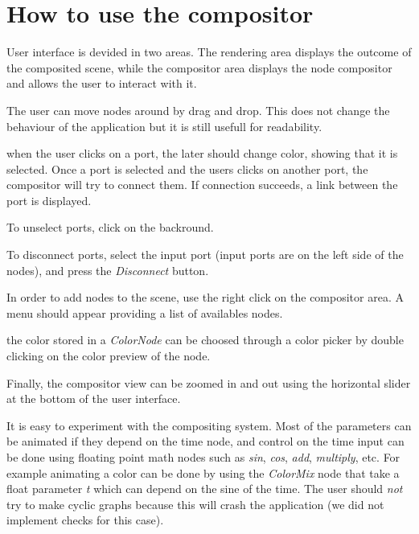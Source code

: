 

\section{ How to use the compositor }

User interface is devided in two areas. The rendering area displays the outcome of the composited scene,
while the compositor area displays the node compositor and allows the user to interact with it.

The user can move nodes around by drag and drop. This does not change the behaviour of the
application but it is still usefull for readability.

when the user clicks on a port, the later should change color, showing that it is selected.
Once a port is selected and the users clicks on another port, the compositor will
try to connect them. If connection succeeds, a link between the port is displayed.

To unselect ports, click on the backround.

To disconnect ports, select the input port (input ports are on the left side of
the nodes), and press the \textit{Disconnect} button.

In order to add nodes to the scene, use the right click on the compositor area.
A menu should appear providing a list of availables nodes.

the color stored in a \textit{ColorNode} can be choosed through a color picker by
double clicking on the color preview of the node.

Finally, the compositor view can be zoomed in and out using the horizontal slider
at the bottom of the user interface. 


It is easy to experiment with the compositing system. Most of the parameters can
be animated if they depend on the time node, and control on the time input can be
done using floating point math nodes such as \textit{sin}, \textit{cos}, \textit{add},
\textit{multiply}, etc. For example animating a color can be done by using the
\textit{ColorMix} node that take a float parameter \textit{t} which can depend on
the sine of the time.
The user should \textit{not} try to make cyclic graphs because this will
crash the application (we did not implement checks for this case).

